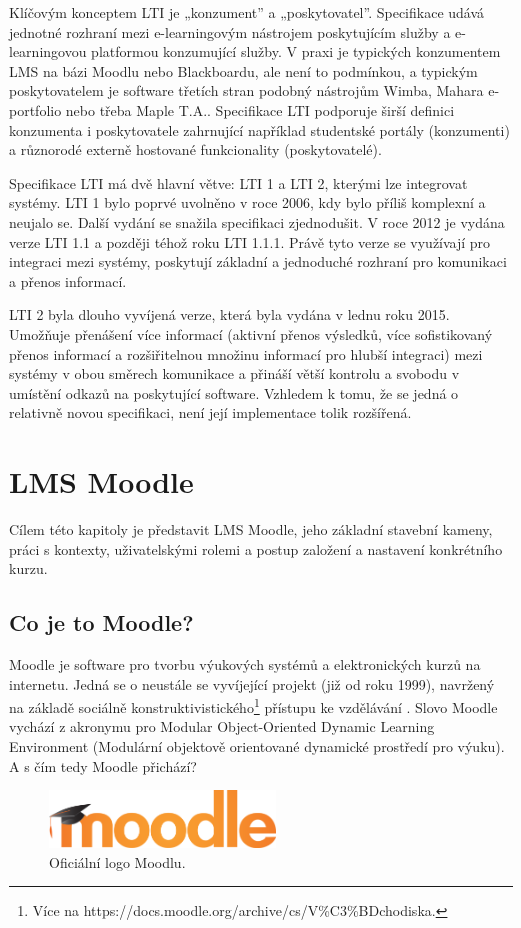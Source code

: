 \documentclass[
print,
  11pt,
  table,   
  nolof,    
  nolot,
  oneside,
  final
]{fithesis3}
\begin{document}
Klíčovým konceptem LTI je „konzument” a „poskytovatel”. Specifikace udává jednotné rozhraní mezi e-learningovým nástrojem poskytujícím služby a e-learningovou platformou konzumující služby. V praxi je typických konzumentem LMS na bázi Moodlu nebo Blackboardu, ale není to podmínkou, a typickým poskytovatelem je software třetích stran podobný nástrojům Wimba, Mahara e-portfolio nebo třeba Maple T.A.. Specifikace LTI podporuje širší definici konzumenta i poskytovatele zahrnující například studentské portály (konzumenti) a různorodé externě hostované funkcionality (poskytovatelé). \cite{imsltiinvest}


Specifikace LTI má dvě hlavní větve: LTI 1 a LTI 2, kterými lze integrovat systémy. LTI 1 bylo poprvé uvolněno v roce 2006, kdy bylo příliš komplexní a neujalo se. Další vydání se snažila specifikaci zjednodušit. V roce 2012 je vydána verze LTI 1.1 a později téhož roku LTI 1.1.1. Právě tyto verze se využívají pro integraci mezi systémy, poskytují základní a jednoduché rozhraní pro komunikaci a přenos informací.

LTI 2 byla dlouho vyvíjená verze, která byla vydána v lednu roku 2015. Umožňuje přenášení více informací (aktivní přenos výsledků, více sofistikovaný přenos informací a rozšiřitelnou množinu informací pro hlubší integraci) mezi systémy v obou směrech komunikace a přináší větší kontrolu a svobodu v umístění odkazů na poskytující software. Vzhledem k tomu, že se jedná o relativně novou specifikaci, není její implementace tolik rozšířená. \cite{imslti20}



\chapter{LMS Moodle}
Cílem této kapitoly je představit LMS Moodle, jeho základní stavební kameny, práci s kontexty, uživatelskými rolemi  a postup založení a nastavení konkrétního kurzu.
	\section{Co je to Moodle?}
Moodle je software pro tvorbu výukových systémů a elektronických kurzů na internetu. Jedná se o neustále se vyvíjející projekt (již od roku 1999), navržený na základě sociálně konstruktivistického\footnote{Více na https://docs.moodle.org/archive/cs/V\%C3\%BDchodiska.}  přístupu ke vzdělávání \cite{moodle-what-is}.  Slovo Moodle vychází z akronymu pro Modular Object-Oriented Dynamic Learning Environment (Modulární objektově orientované dynamické prostředí pro výuku). A s čím tedy Moodle přichází?
		\begin{figure}
		  \begin{center}
		    \includegraphics[width=60mm]{images/moodle-logo.png}
		   \end{center}
		  \caption{Oficiální logo Moodlu. \cite{moodle-logo}}
		  \label{fig:moodlelogo}
		\end{figure}
\end{document}
